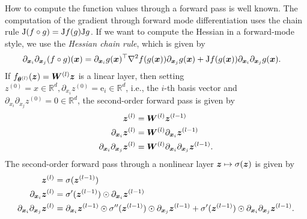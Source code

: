 How to compute the function values through a forward pass is well known. 
The computation of the gradient through forward mode differentiation uses the chain rule $\mathrm{J} (f\circ g) = \mathrm{J} f (g) \mathrm{J} g$. 
If we want to compute the Hessian in a forward-mode style, we use the \emph{Hessian chain rule}, which is given by 
\begin{align} 
       \partial_{{\bm{x}}_i} \partial_{{\bm{x}}_j} (f \circ g)({\bm{x}}) & = \partial_{{\bm{x}}_i} g({\bm{x}})^\top \nabla^2f(g({\bm{x}}))\partial_{{\bm{x}}_j} g({\bm{x}}) + \mathrm{J} f(g({\bm{x}})) \partial_{{\bm{x}}_i} \partial_{{\bm{x}}_j} g({\bm{x}}). 
\end{align}
If $f_{\vtheta^{(l)}}(\vz) = \mW^{(l)} \vz %
$ is a linear layer, then setting $z^{(0)} = x\in\mathbb R^d, \partial_{x_i}z^{(0)} = \textrm{e}_i\in\mathbb R^d$, i.e., the $i$-th basis vector and $\partial_{x_i}\partial_{x_j}z^{(0)} = 0\in\mathbb R^d$, the second-order forward pass is given by 
\begin{subequations}
    \begin{align}
    \vz^{(l)} & = \mW^{(l)} \vz^{(l-1)} %
    \\ 
    \partial_{\vx_i} \vz^{(l)} & = \mW^{(l)} \partial_{\vx_i} \vz^{(l-1)} \\ 
    \partial_{\vx_i}\partial_{\vx_j} \vz^{(l)} & = \mW^{(l)} \partial_{\vx_i}\partial_{\vx_j} \vz^{(l-1)} \label{subeq:secondOrderForward-LinearLayer}. 
\end{align}
\end{subequations}
The second-order forward pass through a nonlinear layer ${\bm{z}}\mapsto \sigma({\bm{z}})$ is given by  
\begin{subequations}
    \begin{align}
    {\bm{z}}^{(l)} & = \sigma({\bm{z}}^{(l-1)}) \\ 
    \partial_{{\bm{x}}_i} {\bm{z}}^{(l)} & = \sigma'({\bm{z}}^{(l-1)}) \odot \partial_{{\bm{x}}_i} {\bm{z}}^{(l-1)} \\ 
    \partial_{{\bm{x}}_i}\partial_{{\bm{x}}_j} {\bm{z}}^{(l)} & = \partial_{{\bm{x}}_i} {\bm{z}}^{(l-1)} \odot \sigma''({\bm{z}}^{(l-1)}) \odot \partial_{{\bm{x}}_j} {\bm{z}}^{(l-1)} + \sigma'({\bm{z}}^{(l-1)}) \odot \partial_{{\bm{x}}_i} \partial_{{\bm{x}}_j} {\bm{z}}^{(l-1)} \label{subeq:secondOrderForward-nonlinearLayer}. 
\end{align}
\end{subequations}



